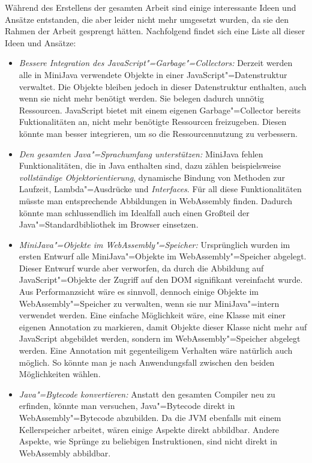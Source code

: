 Während des Erstellens der gesamten Arbeit sind einige interessante Ideen und Ansätze entstanden, die aber leider nicht mehr umgesetzt wurden, da sie den Rahmen der Arbeit gesprengt hätten. Nachfolgend findet sich eine Liste all dieser Ideen und Ansätze:
\begin{itemize}
    \item \emph{Bessere Integration des JavaScript"=Garbage"=Collectors:} Derzeit werden alle in MiniJava verwendete Objekte in einer JavaScript"=Datenstruktur verwaltet. Die Objekte bleiben jedoch in dieser Datenstruktur enthalten, auch wenn sie nicht mehr benötigt werden. Sie belegen dadurch unnötig Ressourcen. JavaScript bietet mit einem eigenen Garbage"=Collector bereits Fuktionalitäten an, nicht mehr benötigte Ressourcen freizugeben. Diesen könnte man besser integrieren, um so die Ressourcennutzung zu verbessern.
    \item \emph{Den gesamten Java"=Sprachumfang unterstützen:} MiniJava fehlen Funktionalitäten, die in Java enthalten sind, dazu zählen beispielsweise \emph{vollständige Objektorientierung}, dynamische Bindung von Methoden zur Laufzeit, Lambda"=Ausdrücke und \emph{Interfaces}. Für all diese Funktionalitäten müsste man entsprechende Abbildungen in WebAssembly finden. Dadurch könnte man schlussendlich im Idealfall auch einen Großteil der Java"=Standardbibliothek im Browser einsetzen.
    \item \emph{MiniJava"=Objekte im WebAssembly"=Speicher:} Ursprünglich wurden im ersten Entwurf alle MiniJava"=Objekte im WebAssembly"=Speicher abgelegt. Dieser Entwurf wurde aber verworfen, da durch die Abbildung auf JavaScript"=Objekte der Zugriff auf den DOM signifikant vereinfacht wurde. Aus Performanzsicht wäre es sinnvoll, dennoch einige Objekte im WebAssembly"=Speicher zu verwalten, wenn sie nur MiniJava"=intern verwendet werden. Eine einfache Möglichkeit wäre, eine Klasse mit einer eigenen Annotation zu markieren, damit Objekte dieser Klasse nicht mehr auf JavaScript abgebildet werden, sondern im WebAssembly"=Speicher abgelegt werden. Eine Annotation mit gegenteiligem Verhalten wäre natürlich auch möglich. So könnte man je nach Anwendungsfall zwischen den beiden Möglichkeiten wählen.
    \pagebreak
    \item \emph{Java"=Bytecode konvertieren:} Anstatt den gesamten Compiler neu zu erfinden, könnte man versuchen, Java"=Bytecode direkt in WebAssembly"=Bytecode abzubilden. Da die JVM ebenfalls mit einem Kellerspeicher arbeitet, wären einige Aspekte direkt abbildbar. Andere Aspekte, wie Sprünge zu beliebigen Instruktionen, sind nicht direkt in WebAssembly abbildbar.

\end{itemize}
